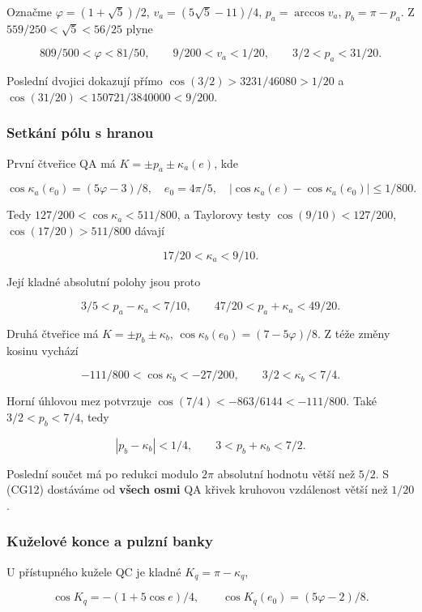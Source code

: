 \documentclass[11pt,a4paper]{article}
\theoremstyle{remark}\newtheorem{remark}[theorem]{Poznámka}
\numberwithin{equation}{section}
\begin{document}
Označme \(\varphi=(1+\sqrt5)/2\), \(v_a=(5\sqrt5-11)/4\),
\(p_a=\arccos v_a\), \(p_b=\pi-p_a\). Z \(559/250<\sqrt5<56/25\) plyne

\[
809/500<\varphi<81/50,\qquad
9/200<v_a<1/20,\qquad 3/2<p_a<31/20.
\tag{CG14}
\]

Poslední dvojici dokazují přímo \(\cos(3/2)>3231/46080>1/20\) a
\(\cos(31/20)<150721/3840000<9/200\).

\hypertarget{setkuxe1nuxed-puxf3lu-s-hranou}{%
\subsubsection{Setkání pólu s
hranou}\label{setkuxe1nuxed-puxf3lu-s-hranou}}

První čtveřice QA má \(K=\pm p_a\pm\kappa_a(e)\), kde

\[
\cos\kappa_a(e_0)=(5\varphi-3)/8,
\quad e_0=4\pi/5,
\quad
|\cos\kappa_a(e)-\cos\kappa_a(e_0)|\le1/800.
\]

Tedy \(127/200<\cos\kappa_a<511/800\), a Taylorovy testy
\(\cos(9/10)<127/200\), \(\cos(17/20)>511/800\) dávají

\[
17/20<\kappa_a<9/10.
\]

Její kladné absolutní polohy jsou proto

\[
3/5<p_a-\kappa_a<7/10,
\qquad 47/20<p_a+\kappa_a<49/20.
\tag{CG15}
\]

Druhá čtveřice má \(K=\pm p_b\pm\kappa_b\),
\(\cos\kappa_b(e_0)=(7-5\varphi)/8\). Z téže změny kosinu vychází

\[
-111/800<\cos\kappa_b<-27/200,
\qquad 3/2<\kappa_b<7/4.
\]

Horní úhlovou mez potvrzuje \(\cos(7/4)<-863/6144<-111/800\). Také
\(3/2<p_b<7/4\), tedy

\[
|p_b-\kappa_b|<1/4,
\qquad 3<p_b+\kappa_b<7/2.
\tag{CG16}
\]

Poslední součet má po redukci modulo \(2\pi\) absolutní hodnotu větší
než \(5/2\). S (CG12) dostáváme od \textbf{všech osmi} QA křivek
kruhovou vzdálenost větší než \(1/20\).

\hypertarget{kuux17eelovuxe9-konce-a-pulznuxed-banky}{%
\subsubsection{Kuželové konce a pulzní
banky}\label{kuux17eelovuxe9-konce-a-pulznuxed-banky}}

U přístupného kužele QC je kladné \(K_q=\pi-\kappa_q\),

\[
\cos K_q=-(1+5\cos e)/4,
\qquad \cos K_q(e_0)=(5\varphi-2)/8.
\]
\end{document}
